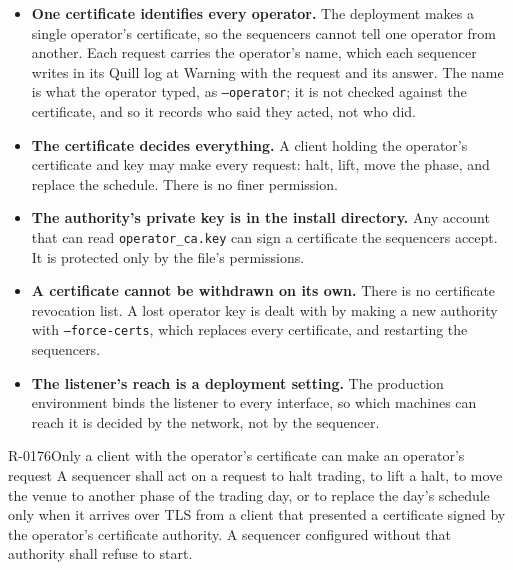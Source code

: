 \begin{itemize}
  \item \textbf{One certificate identifies every operator.} The deployment makes
        a single operator's certificate, so the sequencers cannot tell one
        operator from another. Each request carries the operator's name, which
        each sequencer writes in its Quill log at Warning with the request and
        its answer. The name is what the operator typed, as
        \texttt{--operator}; it is not checked against the certificate, and so
        it records who said they acted, not who did.
  \item \textbf{The certificate decides everything.} A client holding the
        operator's certificate and key may make every request: halt, lift, move
        the phase, and replace the schedule. There is no finer permission.
  \item \textbf{The authority's private key is in the install directory.} Any
        account that can read \texttt{operator\_ca.key} can sign a certificate
        the sequencers accept. It is protected only by the file's permissions.
  \item \textbf{A certificate cannot be withdrawn on its own.} There is no
        certificate revocation list. A lost operator key is dealt with by making
        a new authority with \texttt{--force-certs}, which replaces every
        certificate, and restarting the sequencers.
  \item \textbf{The listener's reach is a deployment setting.} The production
        environment binds the listener to every interface, so which machines
        can reach it is decided by the network, not by the sequencer.
\end{itemize}

\begin{requirement}{R-0176}{Only a client with the operator's certificate can make an operator's request}
  A sequencer shall act on a request to halt trading, to lift a halt, to
  move the venue to another phase of the trading day, or to replace the day's
  schedule only when it arrives over
  TLS from a client that presented a certificate signed by the operator's
  certificate authority. A sequencer configured without that authority shall
  refuse to start.
\end{requirement}

